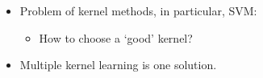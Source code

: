 \documentclass{beamer}
\begin{document}
\begin{frame}
\begin{itemize}
{\begin{itemize}
					\item Dual form:
					\begin{IEEEeqnarray}{ll} \label{eqn:svmdual}
						\max_{\alpha}\qquad & -\sum_{i=1}^n\sum_{j=1}^n y_i y_j\Big(\Phi(x_i)\cdot \Phi(x_j)\Big)\alpha_i\alpha_j+\sum_{j=1}^n \alpha_j\nonumber\\
						\qquad &\sum_{i=1}^n \alpha_i y_i=0,\nonumber\\ 
						&0\leq\alpha_i\leq C,~i=1,\ldots,n	 \nonumber
					\end{IEEEeqnarray}
				\end{itemize}
			}
			\item<4-> Problem of kernel methods, in particular, SVM:
		    \begin{itemize}
				\item How to choose a `good' kernel?
			\end{itemize}
			\item<5-> Multiple kernel learning is one solution.
		\end{itemize}
	\end{frame}
	
\end{document}
